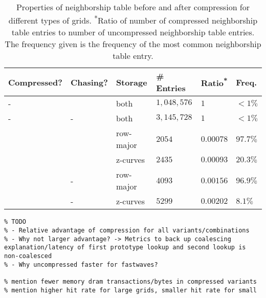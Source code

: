 \begin{table}
	\begin{tabular}{l l l l l l}
		\hline
		Compressed? & Chasing? & Storage & \# Entries & Ratio\textsuperscript{*} & Freq.\textsuperscript{\dag} \\
		\hline
		- & \checkmark & both & $1,048,576$ & $1$ & $<1\%$\\
		- & - & both & $3,145,728$ & $1$ & $<1\%$\\
		\checkmark & \checkmark & row-major & $2054$ & $0.00078$ & $97.7\%$ \\
		\checkmark & \checkmark & z-curves & $2435$ & $0.00093$ & $20.3\%$ \\
		\checkmark & - & row-major & $4093$ & $0.00156$ & $96.9\%$ \\
		\checkmark & - & z-curves & $5299$ & $0.00202$ & $8.1\%$ \\
		\hline
	\end{tabular}
	\caption{\label{tab:compression} Properties of neighborship table before and after compression for different types of grids. \textsuperscript{*}Ratio of number of compressed neighborship table entries to number of uncompressed neighborship table entries. \textsuperscript{\dag}The frequency given is the frequency of the most common neighborship table entry. }
\end{table}

\begin{verbatim}
% TODO
% - Relative advantage of compression for all variants/combinations
% - Why not larger advantage? -> Metrics to back up coalescing explanation/latency of first prototype lookup and second lookup is non-coalesced
% - Why uncompressed faster for fastwaves?

% mention fewer memory dram transactions/bytes in compressed variants
% mention higher hit rate for large grids, smaller hit rate for small
\end{verbatim}
